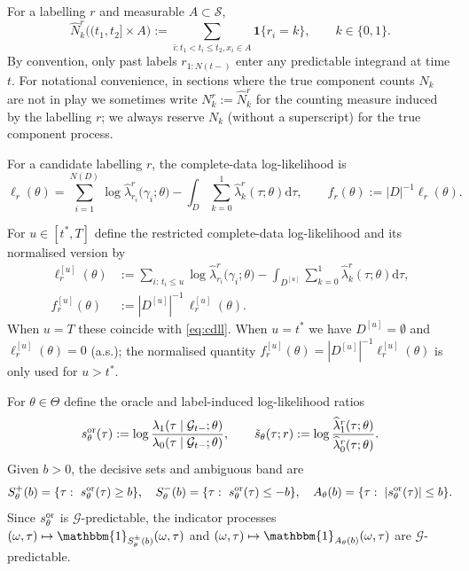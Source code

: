 \documentclass{statsoc}
\newcommand{\dd}{\mathrm{d}}
\newcommand{\1}{\mathbbm{1}}
\begin{document}
For a labelling $r$ and measurable $A\subset \mathcal S$,
\[
\widehat N_k^r\big((t_1,t_2]\times A\big)
:=\sum_{i: t_1<t_i\le t_2, x_i\in A}\mathbf 1\{r_i=k\},\qquad k\in\{0,1\}.
\]
By convention, only past labels $r_{1:N(t-)}$ enter any predictable integrand at time $t$. For notational convenience, in sections where the true component counts $N_k$ are not in play we sometimes write $N_k^r:=\widehat N_k^r$ for the counting measure induced by the labelling $r$; we always reserve $N_k$ (without a
superscript) for the true component process.



For a candidate labelling $r$, the complete-data log-likelihood is
\begin{equation}\label{eq:cdll}
\ell_r(\theta)
=\sum_{i=1}^{N(D)} \log \widehat\lambda_{r_i}^r\!\big(\gamma_i;\theta\big)
-\int_D \sum_{k=0}^1 \widehat\lambda_k^r(\tau;\theta) \dd\tau,\qquad
f_r(\theta):=|D|^{-1}\ell_r(\theta).
\end{equation}

For $u\in[t^\ast,T]$ define the restricted complete-data log-likelihood and its normalised version by
\begin{align}
\ell_r^{[u]}(\theta)
&:=
\sum_{i:\,t_i\le u} \log \widehat\lambda_{r_i}^r\!\big(\gamma_i;\theta\big)
-\int_{D^{[u]}} \sum_{k=0}^1 \widehat\lambda_k^r(\tau;\theta) \dd\tau,
\label{eq:cdll-restricted}\\
f_r^{[u]}(\theta)
&:=|D^{[u]}|^{-1}\,\ell_r^{[u]}(\theta).
\nonumber
\end{align}
When $u=T$ these coincide with \eqref{eq:cdll}. When $u=t^\ast$ we have $D^{[u]}=\emptyset$ and $\ell_r^{[u]}(\theta)=0$ (a.s.); the normalised quantity
$f_r^{[u]}(\theta)=|D^{[u]}|^{-1}\ell_r^{[u]}(\theta)$ is only used for $u>t^\ast$.


For $\theta\in\Theta$ define the oracle and label-induced log-likelihood ratios
\[
s^{\rm or}_\theta(\tau):=\log\frac{\lambda_1(\tau\mid \mathcal G_{t-};\theta)}{\lambda_0(\tau\mid \mathcal G_{t-};\theta)},\qquad
\tilde s_\theta(\tau;r):=\log\frac{\widehat\lambda_1^r(\tau;\theta)}{\widehat\lambda_0^r(\tau;\theta)}.
\]
Given $b>0$, the decisive sets and ambiguous band are
\[
S_\theta^+(b)=\{ \tau:\ s^{\rm or}_\theta(\tau)\ge b \},\quad
S_\theta^-(b)=\{ \tau:\ s^{\rm or}_\theta(\tau)\le -b \},\quad
A_\theta(b)=\{ \tau:\ |s^{\rm or}_\theta(\tau)|\le b \}.
\]
Since $s_\theta^{\rm or}$ is $\mathcal G$-predictable, the indicator processes $(\omega,\tau)\mapsto \1_{S_\theta^\pm(b)}(\omega,\tau)$ and $(\omega,\tau)\mapsto \1_{A_\theta(b)}(\omega,\tau)$ are $\mathcal G$-predictable.
\end{document}
